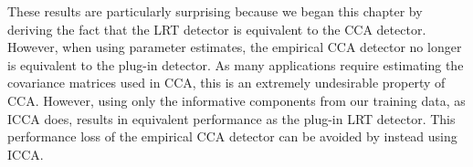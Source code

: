 These results are particularly surprising because we began this chapter by deriving the
fact that the LRT detector is equivalent to the CCA detector. However, when using
parameter estimates, the empirical CCA detector no longer is equivalent to the plug-in
detector. As many applications require estimating the covariance matrices used in CCA,
this is an extremely undesirable property of CCA. However, using only the informative
components from our training data, as ICCA does, results in equivalent performance as the
plug-in LRT detector. This performance loss of the empirical CCA detector can be avoided
by instead using ICCA.

